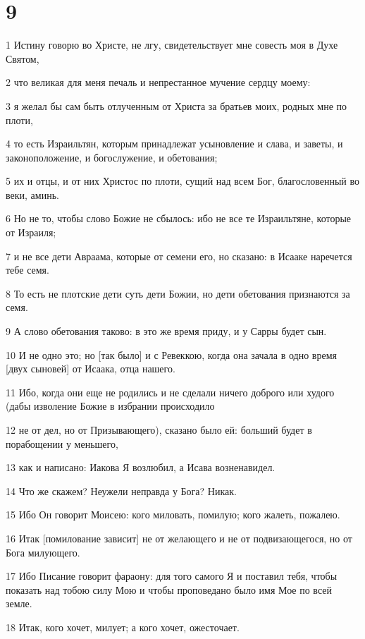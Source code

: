 \chapter{9}

\par 1 Истину говорю во Христе, не лгу, свидетельствует мне совесть моя в Духе Святом,
\par 2 что великая для меня печаль и непрестанное мучение сердцу моему:
\par 3 я желал бы сам быть отлученным от Христа за братьев моих, родных мне по плоти,
\par 4 то есть Израильтян, которым принадлежат усыновление и слава, и заветы, и законоположение, и богослужение, и обетования;
\par 5 их и отцы, и от них Христос по плоти, сущий над всем Бог, благословенный во веки, аминь.
\par 6 Но не то, чтобы слово Божие не сбылось: ибо не все те Израильтяне, которые от Израиля;
\par 7 и не все дети Авраама, которые от семени его, но сказано: в Исааке наречется тебе семя.
\par 8 То есть не плотские дети суть дети Божии, но дети обетования признаются за семя.
\par 9 А слово обетования таково: в это же время приду, и у Сарры будет сын.
\par 10 И не одно это; но [так было] и с Ревеккою, когда она зачала в одно время [двух сыновей] от Исаака, отца нашего.
\par 11 Ибо, когда они еще не родились и не сделали ничего доброго или худого (дабы изволение Божие в избрании происходило
\par 12 не от дел, но от Призывающего), сказано было ей: больший будет в порабощении у меньшего,
\par 13 как и написано: Иакова Я возлюбил, а Исава возненавидел.
\par 14 Что же скажем? Неужели неправда у Бога? Никак.
\par 15 Ибо Он говорит Моисею: кого миловать, помилую; кого жалеть, пожалею.
\par 16 Итак [помилование зависит] не от желающего и не от подвизающегося, но от Бога милующего.
\par 17 Ибо Писание говорит фараону: для того самого Я и поставил тебя, чтобы показать над тобою силу Мою и чтобы проповедано было имя Мое по всей земле.
\par 18 Итак, кого хочет, милует; а кого хочет, ожесточает.
